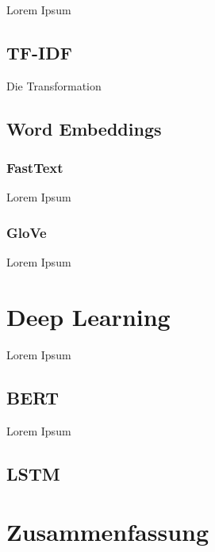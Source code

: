 Lorem Ipsum

\subsection{TF-IDF}

Die Transformation 

\subsection{Word Embeddings}


\subsubsection{FastText}

Lorem Ipsum

\subsubsection{GloVe}

Lorem Ipsum

\section{Deep Learning}

Lorem Ipsum

\subsection{BERT}

Lorem Ipsum

\subsection{LSTM}

\section{Zusammenfassung}

